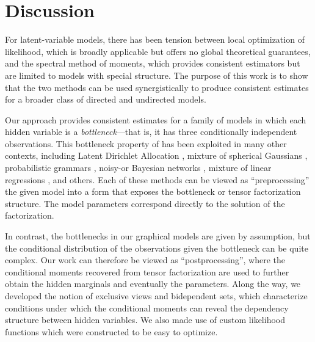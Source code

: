 \section{Discussion}
\label{sec:discussion}

For latent-variable models,
there has been tension between
local optimization of likelihood,
which is broadly applicable but offers no global theoretical guarantees,
and the spectral method of moments, which provides consistent estimators
but are limited to models with special structure.
The purpose of this work is to show that the two methods
can be used synergistically to produce consistent estimates
for a broader class of directed and undirected models.

Our approach provides consistent estimates for
a family of models in which each hidden variable is a \emph{bottleneck}---that is,
it has three conditionally independent observations.
This bottleneck property of \citet{anandkumar13tensor}
has been exploited in many other contexts,
including Latent Dirichlet Allocation \cite{anandkumar12lda},
mixture of spherical Gaussians \cite{hsu13spherical},
probabilistic grammars \cite{hsu12identifiability},
noisy-or Bayesian networks \cite{halpern13noisyor},
mixture of linear regressions \cite{chaganty13regression},
and others.
Each of these methods can be viewed as ``preprocessing'' the given model into a
form that exposes the bottleneck or tensor factorization structure.
The model parameters correspond directly to the solution of the factorization.

In contrast, the bottlenecks in our graphical models are given by assumption,
but the conditional distribution of the observations given the bottleneck
can be quite complex.
Our work can therefore be viewed as ``postprocessing'',
where the conditional moments recovered from tensor factorization
are used to further obtain the hidden marginals and eventually the parameters.
Along the way, we developed the notion of exclusive views and bidependent sets,
which characterize conditions under which the conditional moments can reveal
the dependency structure between hidden variables.
We also made use of custom likelihood functions which were constructed to be
easy to optimize.


